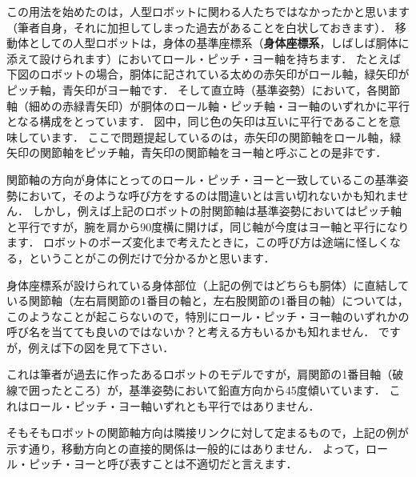 ﻿\documentclass[a4paper]{jsarticle}
\begin{document}
この用法を始めたのは，人型ロボットに関わる人たちではなかったかと思います（筆者自身，それに加担してしまった過去があることを白状しておきます）．
移動体としての人型ロボットは，身体の基準座標系（{\bf 身体座標系}，しばしば胴体に添えて設けられます）においてロール・ピッチ・ヨー軸を持ちます．
たとえば下図のロボットの場合，胴体に記されている太めの赤矢印がロール軸，緑矢印がピッチ軸，青矢印がヨー軸です．
そして直立時（基準姿勢）において，各関節軸（細めの赤緑青矢印）が胴体のロール軸・ピッチ軸・ヨー軸のいずれかに平行となる構成をとっています．
図中，同じ色の矢印は互いに平行であることを意味しています．
ここで問題提起しているのは，赤矢印の関節軸をロール軸，緑矢印の関節軸をピッチ軸，青矢印の関節軸をヨー軸と呼ぶことの是非です．

\begin{figure*}[h]
\begin{center}

\end{center}
\end{figure*}

関節軸の方向が身体にとってのロール・ピッチ・ヨーと一致しているこの基準姿勢において，そのような呼び方をするのは間違いとは言い切れないかも知れません．
しかし，例えば上記のロボットの肘関節軸は基準姿勢においてはピッチ軸と平行ですが，腕を肩から90度横に開けば，同じ軸が今度はヨー軸と平行になります．
ロボットのポーズ変化まで考えたときに，この呼び方は途端に怪しくなる，ということがこの例だけで分かるかと思います．

身体座標系が設けられている身体部位（上記の例ではどちらも胴体）に直結している関節軸（左右肩関節の1番目の軸と，左右股関節の1番目の軸）については，このようなことが起こらないので，特別にロール・ピッチ・ヨー軸のいずれかの呼び名を当てても良いのではないか？と考える方もいるかも知れません．
ですが，例えば下の図を見て下さい．

\begin{figure*}[h]
\begin{center}

\end{center}
\end{figure*}

これは筆者が過去に作ったあるロボットのモデルですが，肩関節の1番目軸（破線で囲ったところ）が，基準姿勢において鉛直方向から45度傾いています．
これはロール・ピッチ・ヨー軸いずれとも平行ではありません．

そもそもロボットの関節軸方向は隣接リンクに対して定まるもので，上記の例が示す通り，移動方向との直接的関係は一般的にはありません．
よって，ロール・ピッチ・ヨーと呼び表すことは不適切だと言えます．
\end{document}
